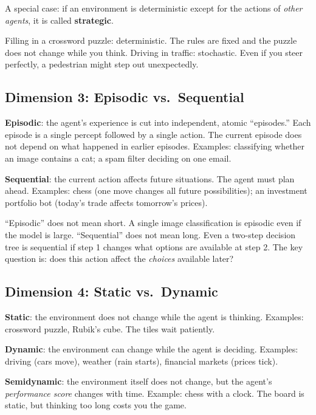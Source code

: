 \documentclass[a4paper,11pt]{article}
\newcommand{\vocab}[1]{\textbf{\color{navy}#1}}
\begin{document}
A special case: if an environment is deterministic except for the actions of
\emph{other agents}, it is called \vocab{strategic}.

\begin{everyday}
Filling in a crossword puzzle: deterministic. The rules are fixed and the puzzle
does not change while you think. Driving in traffic: stochastic. Even if you
steer perfectly, a pedestrian might step out unexpectedly.
\end{everyday}

\subsection{Dimension 3: Episodic vs.\ Sequential}

\vocab{Episodic}: the agent's experience is cut into independent, atomic
``episodes.'' Each episode is a single percept followed by a single action.
The current episode does not depend on what happened in earlier episodes.
Examples: classifying whether an image contains a cat; a spam filter deciding
on one email.

\vocab{Sequential}: the current action affects future situations. The agent must
plan ahead. Examples: chess (one move changes all future possibilities); an
investment portfolio bot (today's trade affects tomorrow's prices).

\begin{watchout}
``Episodic'' does not mean short. A single image classification is episodic even
if the model is large. ``Sequential'' does not mean long. Even a two-step decision
tree is sequential if step 1 changes what options are available at step 2.
The key question is: does this action affect the \emph{choices} available later?
\end{watchout}

\subsection{Dimension 4: Static vs.\ Dynamic}

\vocab{Static}: the environment does not change while the agent is thinking.
Examples: crossword puzzle, Rubik's cube. The tiles wait patiently.

\vocab{Dynamic}: the environment can change while the agent is deciding.
Examples: driving (cars move), weather (rain starts), financial markets
(prices tick).

\vocab{Semidynamic}: the environment itself does not change, but the agent's
\emph{performance score} changes with time. Example: chess with a clock.
The board is static, but thinking too long costs you the game.
\end{document}
